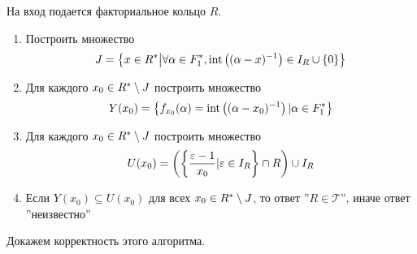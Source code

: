 \documentclass[_00_dissertation.tex]{subfiles}
\begin{document}
\begin{algorithm}\label{algorithm:R_in_S}
    На вход подается факториальное кольцо $R$.
    
    \begin{enumerate}
        \item Построить множество
        \begin{equation*}
            J = \left\{
                x \in R^{*} \big| \forall \alpha \in F_1^{*}, \textrm{int}\left((\alpha - x)^{-1}\right) \in I_{R} \cup \{0\}
            \right\}
        \end{equation*}
        
        \item Для каждого $x_0 \in R^{*} \setminus J$ построить множество
        \begin{equation*}
            Y(x_0) = \left\{
                f_{x_0}(\alpha) = \textrm{int}\left((\alpha - x_0)^{-1}\right) | \alpha \in F_1^{*}
            \right\}
        \end{equation*}
        
        \item Для каждого $x_0 \in R^{*} \setminus J$ построить множество
        \begin{equation*}
            U(x_0) = \left(
                \left\{
                    \frac{\varepsilon - 1}{x_0} | \varepsilon \in I_{R}
                \right\} \cap R
            \right) \cup I_{R}
        \end{equation*}
        
        \item Если $Y(x_0) \subseteq U(x_0)$ для всех $x_0 \in R^{*} \setminus J$, то ответ ''$R \in \mathcal{T}$'', иначе ответ ''неизвестно''
    \end{enumerate}
\end{algorithm}

Докажем корректность этого алгоритма.
\end{document}
